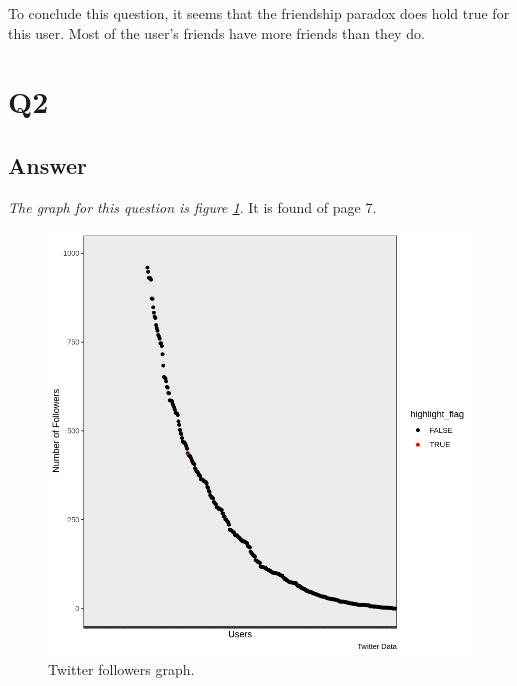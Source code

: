 \documentclass[12pt]{article}
\begin{document}
To conclude this question, it seems that the friendship paradox does hold true for this user.  Most of the user's friends have more friends than they do.


\section*{Q2}

\subsection*{Answer}











\emph{The graph for this question is figure \ref{followersGraph}}.  It is found of page 7.

\begin{figure}[h]
    \centering
    \includegraphics[width=\textwidth] {twitterGraph.png}
    \caption{Twitter followers graph.}
    \label{followersGraph}
\end{figure}
\end{document}
